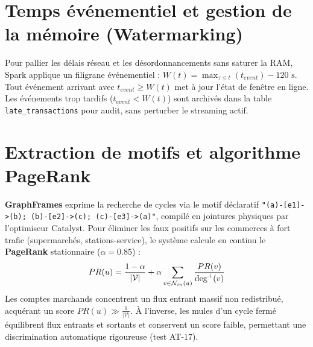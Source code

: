 \section{Temps événementiel et gestion de la mémoire (Watermarking)}

Pour pallier les délais réseau et les désordonnancements sans saturer la RAM, Spark applique un filigrane événementiel : $W(t) = \max_{\tau \le t}(t_{event}) - 120\text{ s}$. Tout événement arrivant avec $t_{event} \ge W(t)$ met à jour l'état de fenêtre en ligne. Les événements trop tardifs ($t_{event} < W(t)$) sont archivés dans la table \texttt{late\_transactions} pour audit, sans perturber le streaming actif.

\section{Extraction de motifs et algorithme PageRank}

\textbf{GraphFrames} exprime la recherche de cycles via le motif déclaratif \texttt{"(a)-[e1]->(b); (b)-[e2]->(c); (c)-[e3]->(a)"}, compilé en jointures physiques par l'optimiseur Catalyst. Pour éliminer les faux positifs sur les commerces à fort trafic (supermarchés, stations-service), le système calcule en continu le \textbf{PageRank} stationnaire ($\alpha = 0.85$) :
\begin{equation}
    PR(u) = \frac{1 - \alpha}{|\mathcal{V}|} + \alpha \sum_{v \in \mathcal{N}_{in}(u)} \frac{PR(v)}{\operatorname{deg}^+(v)}
\end{equation}
Les comptes marchands concentrent un flux entrant massif non redistribué, acquérant un score $PR(u) \gg \frac{1}{|\mathcal{V}|}$. À l'inverse, les mules d'un cycle fermé équilibrent flux entrants et sortants et conservent un score faible, permettant une discrimination automatique rigoureuse (test AT-17).

\newpage
